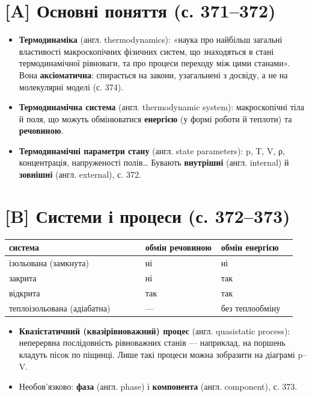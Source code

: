 \documentclass[11pt,a4paper,oneside]{book}
\begin{document}
\section*{[A] Основні поняття (с. 371–372)}
\begin{itemize}
\item \textbf{Термодинаміка} (англ. thermodynamics): «наука про найбільш загальні властивості макроскопічних фізичних систем, що знаходяться в стані термодинамічної рівноваги, та про процеси переходу між цими станами». Вона \textbf{аксіоматична}: спирається на закони, узагальнені з досвіду, а не на молекулярні моделі (с. 374).
\item \textbf{Термодинамічна система} (англ. thermodynamic system): макроскопічні тіла й поля, що можуть обмінюватися \textbf{енергією} (у формі роботи й теплоти) та \textbf{речовиною}.
\item \textbf{Термодинамічні параметри стану} (англ. state parameters): p, T, V, ρ, концентрація, напруженості полів… Бувають \textbf{внутрішні} (англ. internal) й \textbf{зовнішні} (англ. external), с. 372.
\end{itemize}

\section*{[B] Системи і процеси (с. 372–373)}
{\small
\begin{longtable}{>{\raggedright\arraybackslash}p{0.451\linewidth}>{\raggedright\arraybackslash}p{0.251\linewidth}>{\raggedright\arraybackslash}p{0.251\linewidth}}
\toprule
\textbf{система} & \textbf{обмін речовиною} & \textbf{обмін енергією} \\
\midrule
\endhead
ізольована (замкнута) & ні & ні \\
закрита & ні & так \\
відкрита & так & так \\
теплоізольована (адіабатна) & — & без теплообміну \\
\bottomrule
\end{longtable}
}
\begin{itemize}
\item \textbf{Квазістатичний (квазірівноважний) процес} (англ. quasistatic process): неперервна послідовність рівноважних станів — наприклад, на поршень кладуть пісок по піщинці. Лише такі процеси можна зобразити на діаграмі p–V.
\item Необов'язково: \textbf{фаза} (англ. phase) і \textbf{компонента} (англ. component), с. 373.
\end{itemize}
\end{document}
